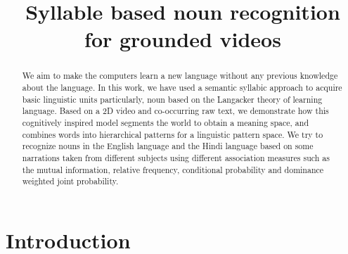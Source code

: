 \documentclass[compsoc]{IEEEtran}
\begin{document}
\title{Syllable based noun recognition\\for grounded videos}
\author{
}

\maketitle


\begin{abstract}
We aim to make the computers learn a new language without any previous knowledge about the language. In this work, we have used a semantic syllabic approach to acquire basic linguistic units particularly, noun based on the Langacker\cite{} theory of learning language. Based on a 2D video and co-occurring raw text, we demonstrate how this cognitively inspired model segments the world to obtain a meaning space, and combines words into hierarchical patterns for a linguistic pattern space. We try to recognize nouns in the English language and the Hindi language based on some narrations taken from different subjects using different association measures such as the mutual information, relative frequency, conditional probability and dominance weighted joint probability.
\end{abstract}


\section{Introduction}
\vspace{10px}
\end{document}

